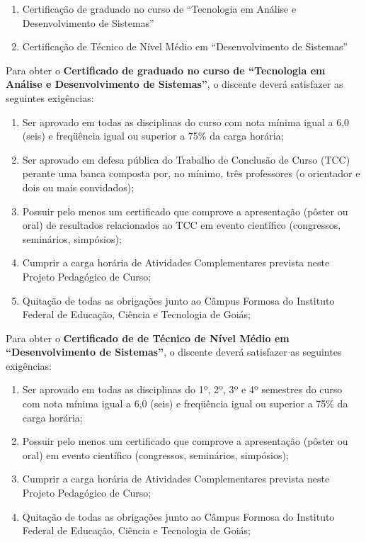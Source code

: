 \documentclass[11pt,fleqn]{book} %
\begin{document}
\begin{enumerate}
	\item Certificação de graduado no curso de ``Tecnologia em Análise e Desenvolvimento de Sistemas''
	\item Certificação de Técnico de Nível Médio em ``Desenvolvimento de Sistemas''
\end{enumerate}
	
Para obter o \textbf{Certificado de graduado no curso de ``Tecnologia em Análise e Desenvolvimento de Sistemas''}, o discente deverá satisfazer as seguintes exigências:
\begin{enumerate}
	\item Ser aprovado em todas as disciplinas do curso com nota mínima igual a 6,0 (seis) e freqüência igual ou superior a 75\% da carga horária;
	\item Ser aprovado em defesa pública do Trabalho de Conclusão de Curso (TCC) perante uma banca composta por, no mínimo, três professores (o orientador e dois ou mais convidados);
	\item Possuir pelo menos um certificado que comprove a apresentação (pôster ou oral) de resultados relacionados ao TCC em evento científico (congressos, seminários, simpósios);
	\item Cumprir a carga horária de Atividades Complementares prevista neste Projeto Pedagógico de Curso;
	\item Quitação de todas as obrigações junto ao Câmpus Formosa do Instituto Federal de Educação, Ciência e Tecnologia de Goiás;
\end{enumerate}


Para obter o \textbf{Certificado de  de Técnico de Nível Médio em ``Desenvolvimento de Sistemas''}, o discente deverá satisfazer as seguintes exigências:
\begin{enumerate}
	\item Ser aprovado em todas as disciplinas do 1º, 2º, 3º e 4º semestres do curso com nota mínima igual a 6,0 (seis) e freqüência igual ou superior a 75\% da carga horária;
	\item Possuir pelo menos um certificado que comprove a apresentação (pôster ou oral) em evento científico (congressos, seminários, simpósios);
	\item Cumprir a carga horária de Atividades Complementares prevista neste Projeto Pedagógico de Curso;
	\item Quitação de todas as obrigações junto ao Câmpus Formosa do Instituto Federal de Educação, Ciência e Tecnologia de Goiás;
\end{enumerate}
\end{document}
